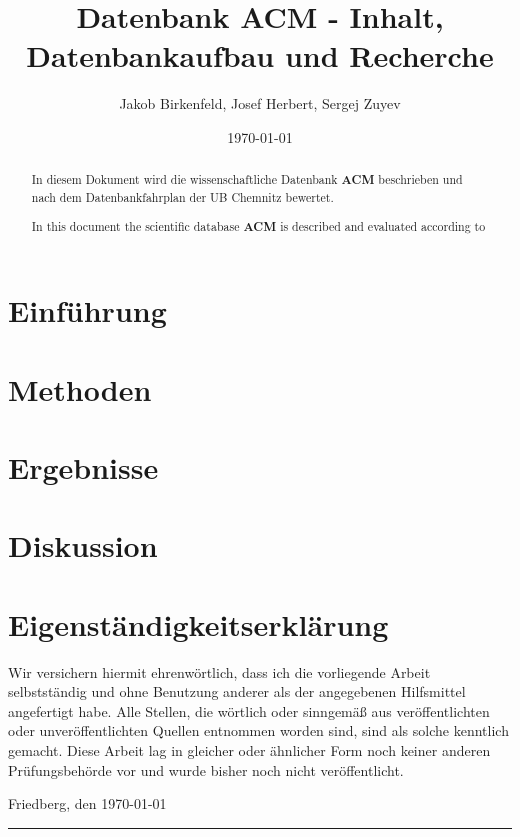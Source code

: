 \documentclass[
	ngerman,
	parskip=half,
	headsepline,
	fontsize=12pt,
	DIV=13,
	listof=leveldown,
	]{scrreprt}
\author{Jakob Birkenfeld, Josef Herbert, Sergej Zuyev}
\title{Datenbank ACM - Inhalt, Datenbankaufbau und Recherche}
\date{\today}
\begin{document}
	\begin{titlepage}
		\maketitle
	\end{titlepage}
	
	\begin{abstract}
		In diesem Dokument wird die wissenschaftliche Datenbank \textbf{ACM} beschrieben und nach dem Datenbankfahrplan der UB Chemnitz \cite{resource:dbf} bewertet.
		
		In this document the scientific database \textbf{ACM} is described and evaluated according to \cite{resource:dbf}
	\end{abstract}

	\clearpage
	
		\tableofcontents
		\listoffigures	
	
	\clearpage
	
	\chapter{Einführung}	
	
		
	
	\chapter{Methoden}
		
		 
	\chapter{Ergebnisse}
		
	\chapter{Diskussion}	
	
	\chapter{Eigenständigkeitserklärung}
	
	Wir versichern hiermit ehrenwörtlich, dass ich die vorliegende Arbeit selbstständig und ohne Benutzung anderer als der angegebenen Hilfsmittel angefertigt habe. Alle Stellen, die wörtlich oder sinngemäß aus veröffentlichten oder unveröffentlichten Quellen entnommen worden sind, sind als solche kenntlich gemacht. Diese Arbeit lag in gleicher oder ähnlicher Form noch keiner anderen Prüfungsbehörde vor und wurde bisher noch nicht veröffentlicht.
	
	Friedberg, den \today
	
	
	\rule[-0.2cm]{5cm}{0.5pt}
	
	\textsc{\theauthor} 

	
	
	
	\printbibliography
\end{document}
